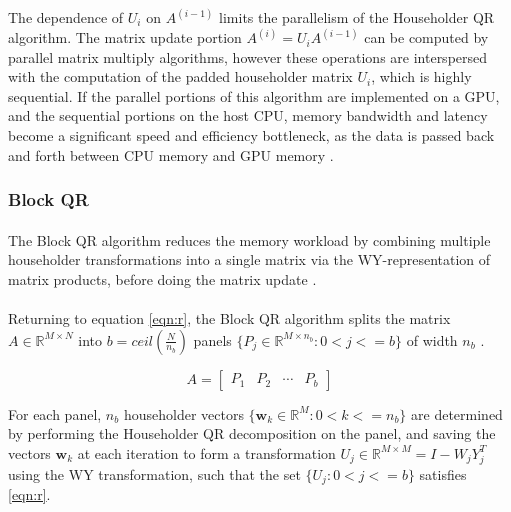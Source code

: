 \documentclass{article}
\begin{document}
\paragraph{}
The dependence of $U_i$ on $A^{(i-1)}$ limits the parallelism of the Householder QR algorithm. The matrix update portion $A^{(i)} = U_iA^{(i-1)}$ can be computed by parallel matrix multiply algorithms, however these operations are interspersed with the computation of the padded householder matrix $U_i$, which is highly sequential. If the parallel portions of this algorithm are implemented on a GPU, and the sequential portions on the host CPU, memory bandwidth and latency become a significant speed and efficiency bottleneck, as the data is passed back and forth between CPU memory and GPU memory \cite{doi:10.1137/19M1296367} \cite{BISCHOFC1987TWrf}.

\subsubsection{Block QR}
\paragraph{}
 The Block QR algorithm reduces the memory workload by combining multiple householder transformations into a single matrix via the WY-representation of matrix products, before doing the matrix update \cite{BISCHOFC1987TWrf}.

\paragraph{}
Returning to equation \eqref{eqn:r}, the Block QR algorithm splits the matrix $A \in\mathbb{R}^{M\times{}N}$ into $b = ceil(\frac{N}{n_b})$ panels $\{P_j \in \mathbb{R}^{M\times{}n_b} : 0 < j <= b\}$ of width $n_b$ \cite{doi:10.1137/19M1296367}.

\begin{equation}
A = 
\begin{bmatrix}
P_1 & P_2 & \cdots & P_b
\end{bmatrix}
\end{equation}

For each panel, $n_b$ householder vectors $\{\mathbf{w}_k \in \mathbb{R}^M : 0 < k <= n_b\}$ are determined by performing the Householder QR decomposition on the panel, and saving the vectors $\mathbf{w}_k$ at each iteration to form a transformation $U_j \in \mathbb{R}^{M\times M} = I - W_jY_j^T$ using the WY transformation, such that the set $\{U_j : 0 < j <= b\}$ satisfies \eqref{eqn:r}.
\end{document}
